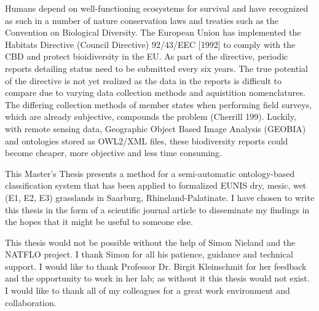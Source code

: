     
    \begin{titlepage}
    Humans depend on well-functioning ecosystems for survival and have
    recognized as such in a number of nature conservation laws and treaties such
    as the Convention on Biological Diversity. The European Union has
    implemented the Habitats Directive (Council Directive) 92/43/EEC [1992] to
    comply with the CBD and protect bioidiversity in the EU. As part of the
    directive, periodic reports detailing status need to be submitted every six
    years. The true potential of the directive is not yet realized as the data
    in the reports is difficult to compare due to varying data collection
    methods and aquistition nomenclatures. The differing collection methods of
    member states when performing field surveys, which are already subjective,
    compounds the problem (Cherrill 199). Luckily, with remote sensing data,
    Geographic Object Based Image Analysis (GEOBIA) and ontologies stored as
    OWL2/XML files, these biodiversity reports could become cheaper, more
    objective and less time consuming.

    This Master's Thesis presents a method for a semi-automatic ontology-based
    classification system that has been applied to formalized EUNIS dry, mesic,
    wet (E1, E2, E3) grasslands in Saarburg, Rhineland-Palatinate. I have chosen
    to write this thesis in the form of a scientific journal article to
    disseminate my findings in the hopes that it might be useful to someone
    else.

    This thesis would not be possible without the help of Simon Nieland and the
    NATFLO project. I thank Simon for all his patience, guidance and technical
    support. I would like to thank Professor Dr. Birgit Kleinschmit for her feedback
    and the opportunity to work in her lab; as without it this thesis would not
    exist. I would like to thank all of my colleagues for a great work
    environment and collaboration. 

    \end{titlepage}